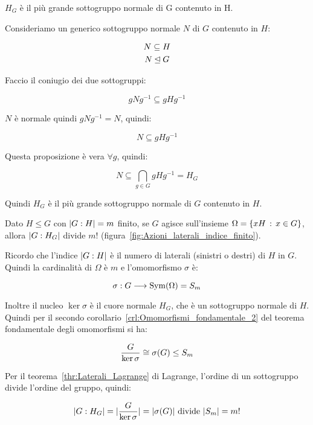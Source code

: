 \begin{teorema}
	$H_G$ è il più grande sottogruppo normale di G contenuto in H.
\end{teorema}
\begin{dimostrazione}
	Consideriamo un generico sottogruppo normale $N$ di $G$ contenuto in $H$:
	
	\begin{gather}
		N \subseteq H \\
		N \unlhd G
	\end{gather}

	Faccio il coniugio dei due sottogruppi:
	
	\begin{equation}
		gNg^{-1} \subseteq gHg^{-1}
	\end{equation}

	$N$ è normale quindi $gNg^{-1} = N$, quindi:
	
	\begin{equation}
		N \subseteq gHg^{-1}
	\end{equation}

	Questa proposizione è vera $\forall g$, quindi:
	
	\begin{equation}
		N \subseteq \bigcap_{g \in G} gHg^{-1} = H_G
	\end{equation}

	Quindi $H_G$ è il più grande sottogruppo normale di $G$ contenuto in $H$.
\end{dimostrazione}

\begin{teorema}
	\label{thr:Azioni_laterali_indice_finito}
	Dato $H \le G$ con $\lvert G:H \rvert= m$ finito, se $G$ agisce sull'insieme $\Omega = \{xH \,:\, x \in G\}$, allora $\lvert G:H_G \rvert$ divide $m!$ (figura~\ref{fig:Azioni_laterali_indice_finito}).
\end{teorema}
\begin{dimostrazione}
	Ricordo che l'indice $\lvert G:H \rvert$ è il numero di laterali (sinistri o destri) di $H$ in $G$. Quindi la cardinalità di $\Omega$ è $m$ e l'omomorfismo $\sigma$ è:
	
	\begin{equation}
		\sigma: G \longrightarrow \operatorname{Sym}(\Omega) = S_m
	\end{equation}

	Inoltre il nucleo $\ker \sigma$ è il cuore normale $H_G$, che è un sottogruppo normale di $H$. Quindi per il secondo corollario~\ref{crl:Omomorfismi_fondamentale_2} del teorema fondamentale degli omomorfismi si ha:
	
	\begin{equation}
		\dfrac{G}{\ker \sigma} \cong \sigma(G) \le S_m
	\end{equation}

	Per il teorema~\ref{thr:Laterali_Lagrange} di Lagrange, l'ordine di un sottogruppo divide l'ordine del gruppo, quindi:
	
	\begin{equation}
		\lvert G:H_G \rvert = \lvert \dfrac{G}{\ker \sigma} \rvert = \lvert \sigma(G) \rvert \text{ divide } \lvert S_m \rvert = m!
	\end{equation}
	
	
\end{dimostrazione}

